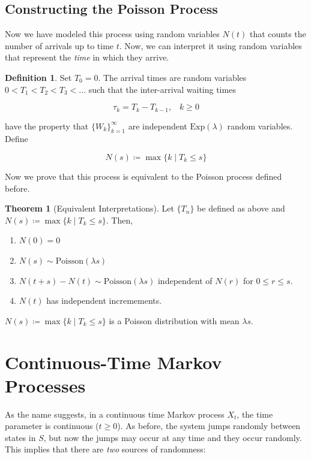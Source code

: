 \documentclass{article}
\theoremstyle{definition}
\newtheorem{theorem}{Theorem}[section]
\theoremstyle{remark}
\theoremstyle{definition}
\newtheorem{definition}{Definition}[section]
\begin{document}
  \subsection{Constructing the Poisson Process}

    Now we have modeled this process using random variables $N(t)$ that counts the number of arrivals up to time $t$. Now, we can interpret it using random variables that represent the \textit{time} in which they arrive. 

    \begin{definition}
      Set $T_0 = 0$. The arrival times are random variables $0 < T_1 < T_2 < T_3 < \ldots$ such that the inter-arrival waiting times

        \[\tau_k = T_k - T_{k-1}, \;\;\; k \geq 0\]

      have the property that $\{W_k\}_{k=1}^\infty$ are independent $\mathrm{Exp}(\lambda)$ random variables. Define 

        \[N(s) \coloneqq \max\{k \mid T_k \leq s \}\]
    \end{definition}

    Now we prove that this process is equivalent to the Poisson process defined before. 

    \begin{theorem}[Equivalent Interpretations]
      Let $\{T_n\}$ be defined as above and $N(s) \coloneqq \max\{k \mid T_k \leq s \}$. Then, 

      \begin{enumerate}
        \item $N(0) = 0$
        \item $N(s) \sim \mathrm{Poisson}(\lambda s)$ 
        \item $N(t + s) - N(t) \sim \mathrm{Poisson}(\lambda s)$ independent of $N(r)$ for $0 \leq r \leq s$. 
        \item $N(t)$ has independent incremements. 
      \end{enumerate}

      $N(s) \coloneqq \max\{k \mid T_k \leq s \}$ is a Poisson distribution with mean $\lambda s$. 
    \end{theorem}

\section{Continuous-Time Markov Processes}

  As the name suggests, in a continuous time Markov process $X_t$, the time parameter is continuous ($t \geq 0$). As before, the system jumps randomly between states in $S$, but now the jumps may occur at any time and they occur randomly. This implies that there are \textit{two} sources of randomness:
\end{document}
